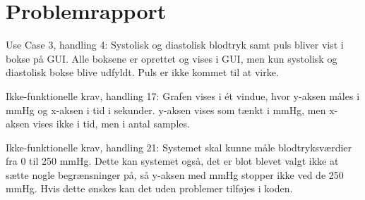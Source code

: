 \newpage
\section{Problemrapport}
Use Case 3, handling 4: Systolisk og diastolisk blodtryk samt puls bliver vist i bokse på GUI. 
Alle boksene er oprettet og vises i GUI, men kun systolisk og diastolisk bokse blive udfyldt. Puls er ikke kommet til at virke. 

Ikke-funktionelle krav, handling 17: Grafen vises i ét vindue, hvor y-aksen måles i mmHg og x-aksen i tid i sekunder. y-aksen vises som tænkt i mmHg, men x-aksen vises ikke i tid, men i antal samples. 

Ikke-funktionelle krav, handling 21: Systemet skal kunne måle blodtryksværdier fra 0 til 250 mmHg. Dette kan systemet også, det er blot blevet valgt ikke at sætte nogle begrænsninger på, så y-aksen med mmHg stopper ikke ved de 250 mmHg. Hvis dette ønskes kan det uden problemer tilføjes i koden. 